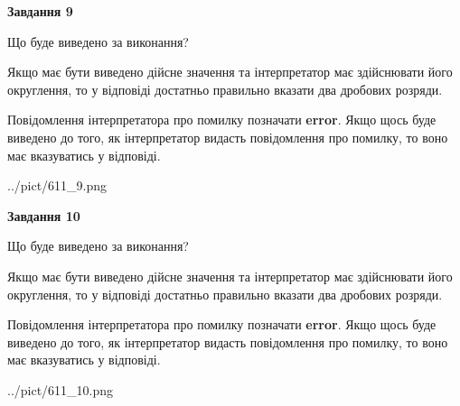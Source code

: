 \documentclass[12pt, ukrainian]{article}
\begin{document}
{\begin {Large}
{\begin {center}\textbf{Завдання 9}\end {center}}\par
Що буде виведено за виконання? \par

Якщо має бути виведено дійсне значення та інтерпретатор має здійснювати його округлення, 
то у відповіді достатньо правильно вказати два дробових розряди.

Повідомлення інтерпретатора про помилку позначати \textbf{error}.
Якщо щось буде виведено до того, як інтерпретатор видасть повідомлення про помилку, 
то воно має вказуватись у відповіді. \par

\begin{center}
	{../pict/611_9.png}
\end{center}
\newpage

{\begin {center}\textbf{Завдання 10}\end {center}}\par
Що буде виведено за виконання? \par

Якщо має бути виведено дійсне значення та інтерпретатор має здійснювати його округлення, 
то у відповіді достатньо правильно вказати два дробових розряди.

Повідомлення інтерпретатора про помилку позначати \textbf{error}.
Якщо щось буде виведено до того, як інтерпретатор видасть повідомлення про помилку, 
то воно має вказуватись у відповіді. \par

\begin{center}
	{../pict/611_10.png}
\end{center}
\newpage

\end {Large}}
\end{document}
